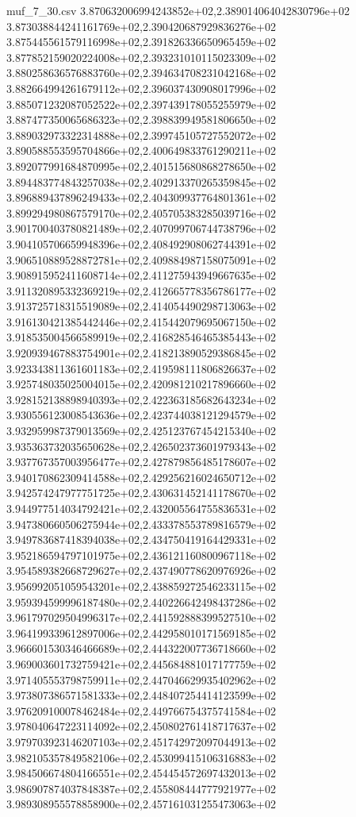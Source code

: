 \begin{filecontents*}{muf_7_30.csv}
3.870632006994243852e+02,2.389014064042830796e+02
3.873038844241161769e+02,2.390420687929836276e+02
3.875445561579116998e+02,2.391826336650965459e+02
3.877852159020224008e+02,2.393231010115023309e+02
3.880258636576883760e+02,2.394634708231042168e+02
3.882664994261679112e+02,2.396037430908017996e+02
3.885071232087052522e+02,2.397439178055255979e+02
3.887477350065686323e+02,2.398839949581806650e+02
3.889032973322314888e+02,2.399745105727552072e+02
3.890588553595704866e+02,2.400649833761290211e+02
3.892077991684870995e+02,2.401515680868278650e+02
3.894483774843257038e+02,2.402913370265359845e+02
3.896889437896249433e+02,2.404309937764801361e+02
3.899294980867579170e+02,2.405705383285039716e+02
3.901700403780821489e+02,2.407099706744738796e+02
3.904105706659948396e+02,2.408492908062744391e+02
3.906510889528872781e+02,2.409884987158075091e+02
3.908915952411608714e+02,2.411275943949667635e+02
3.911320895332369219e+02,2.412665778356786177e+02
3.913725718315519089e+02,2.414054490298713063e+02
3.916130421385442446e+02,2.415442079695067150e+02
3.918535004566589919e+02,2.416828546465385443e+02
3.920939467883754901e+02,2.418213890529386845e+02
3.923343811361601183e+02,2.419598111806826637e+02
3.925748035025004015e+02,2.420981210217896660e+02
3.928152138898940393e+02,2.422363185682643234e+02
3.930556123008543636e+02,2.423744038121294579e+02
3.932959987379013569e+02,2.425123767454215340e+02
3.935363732035650628e+02,2.426502373601979343e+02
3.937767357003956477e+02,2.427879856485178607e+02
3.940170862309414588e+02,2.429256216024650712e+02
3.942574247977751725e+02,2.430631452141178670e+02
3.944977514034792421e+02,2.432005564755836531e+02
3.947380660506275944e+02,2.433378553789816579e+02
3.949783687418394038e+02,2.434750419164429331e+02
3.952186594797101975e+02,2.436121160800967118e+02
3.954589382668729627e+02,2.437490778620976926e+02
3.956992051059543201e+02,2.438859272546233115e+02
3.959394599996187480e+02,2.440226642498437286e+02
3.961797029504996317e+02,2.441592888399527510e+02
3.964199339612897006e+02,2.442958010171569185e+02
3.966601530346466689e+02,2.444322007736718660e+02
3.969003601732759421e+02,2.445684881017177759e+02
3.971405553798759911e+02,2.447046629935402962e+02
3.973807386571581333e+02,2.448407254414123599e+02
3.976209100078462484e+02,2.449766754375741584e+02
3.978040647223114092e+02,2.450802761418717637e+02
3.979703923146207103e+02,2.451742972097044913e+02
3.982105357849582106e+02,2.453099415106316883e+02
3.984506674804166551e+02,2.454454572697432013e+02
3.986907874037848387e+02,2.455808444777921977e+02
3.989308955578858900e+02,2.457161031255473063e+02

\end{filecontents*}
